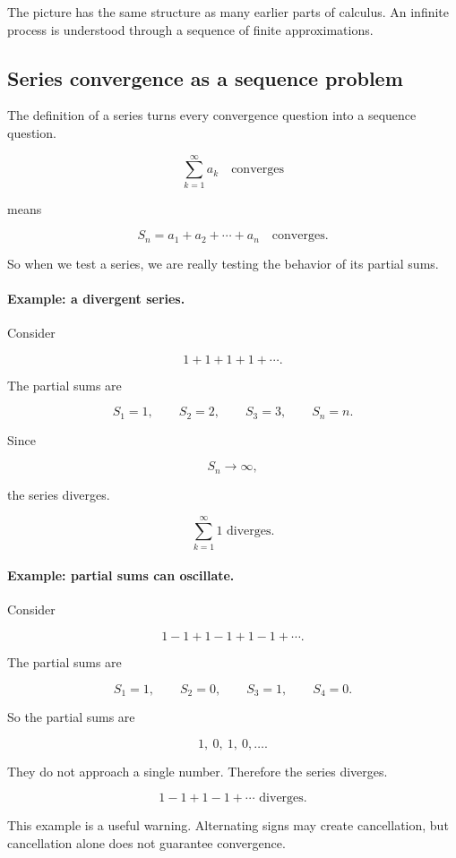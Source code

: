 The picture has the same structure as many earlier parts of calculus.  An infinite
process is understood through a sequence of finite approximations.

\subsection{Series convergence as a sequence problem}
\label{subsec:series-convergence-as-sequence-problem}

The definition of a series turns every convergence question into a sequence question.

\[
\sum_{k=1}^{\infty}a_k
\quad\text{converges}
\]

means

\[
S_n=a_1+a_2+\cdots+a_n
\quad\text{converges}.
\]

So when we test a series, we are really testing the behavior of its partial sums.

\paragraph{Example: a divergent series.}
Consider

\[
1+1+1+1+\cdots.
\]

The partial sums are

\[
S_1=1,
\qquad
S_2=2,
\qquad
S_3=3,
\qquad
S_n=n.
\]

Since

\[
S_n\to\infty,
\]

the series diverges.

\[
\boxed{
\sum_{k=1}^{\infty}1 \text{ diverges.}
}
\]

\paragraph{Example: partial sums can oscillate.}
Consider

\[
1-1+1-1+1-1+\cdots.
\]

The partial sums are

\[
S_1=1,
\qquad
S_2=0,
\qquad
S_3=1,
\qquad
S_4=0.
\]

So the partial sums are

\[
1,\ 0,\ 1,\ 0,\ldots.
\]

They do not approach a single number.  Therefore the series diverges.

\[
\boxed{
1-1+1-1+\cdots \text{ diverges.}
}
\]

This example is a useful warning.  Alternating signs may create cancellation, but
cancellation alone does not guarantee convergence.

